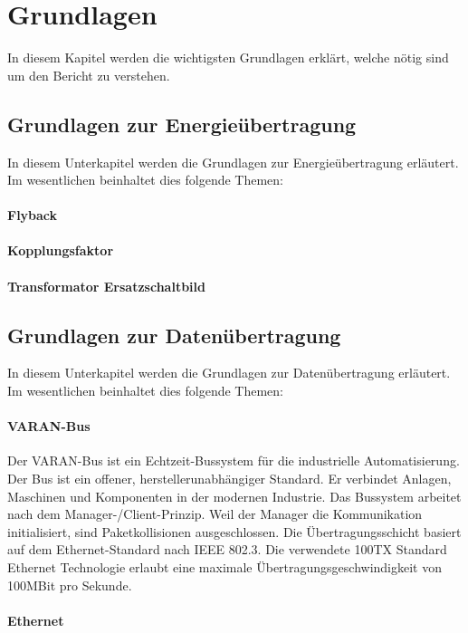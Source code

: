 \section{Grundlagen}
In diesem Kapitel werden die wichtigsten Grundlagen erklärt, welche nötig sind um den Bericht zu verstehen.
\subsection{Grundlagen zur Energieübertragung}
In diesem Unterkapitel werden die Grundlagen zur Energieübertragung erläutert. Im wesentlichen beinhaltet dies folgende Themen:
\paragraph{Flyback}
\paragraph{Kopplungsfaktor}
\paragraph{Transformator Ersatzschaltbild}

\subsection{Grundlagen zur Datenübertragung}
In diesem Unterkapitel werden die Grundlagen zur Datenübertragung erläutert. Im wesentlichen beinhaltet dies folgende Themen:
\paragraph{VARAN-Bus}

Der VARAN-Bus ist ein Echtzeit-Bussystem für die industrielle Automatisierung. Der Bus ist ein offener, herstellerunabhängiger Standard. Er verbindet Anlagen, Maschinen und Komponenten in der modernen Industrie. Das Bussystem arbeitet nach dem Manager-/Client-Prinzip. Weil der Manager die Kommunikation initialisiert, sind Paketkollisionen ausgeschlossen. Die Übertragungsschicht basiert auf dem Ethernet-Standard nach IEEE 802.3. Die verwendete 100TX Standard Ethernet Technologie erlaubt eine maximale Übertragungsgeschwindigkeit von 100MBit pro Sekunde.

\paragraph{Ethernet}

